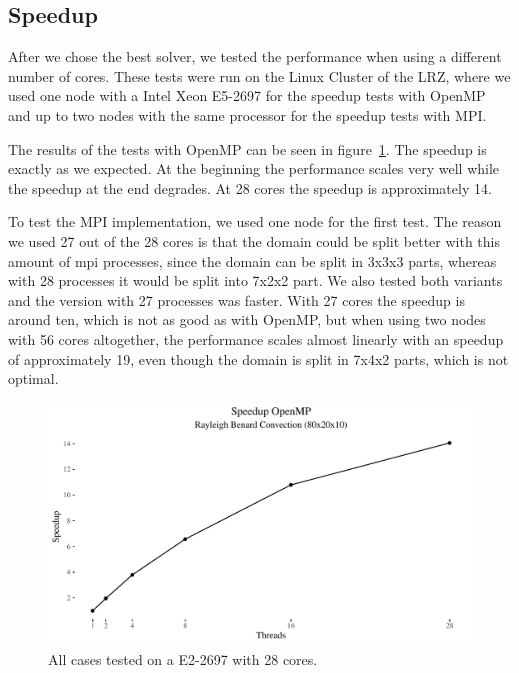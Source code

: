 \documentclass{article}%
\begin{document}
\subsection{Speedup}
After we chose the best solver, we tested the performance when using a different number of cores. These tests were run on the Linux Cluster of the LRZ, where we used one node with a Intel Xeon E5-2697 for the speedup tests with OpenMP and up to two nodes with the same processor for the speedup tests with MPI.

The results of the tests with OpenMP can be seen in figure~\ref{fig:speedup_openmp}. The speedup is exactly as we expected. At the beginning the performance scales very well while the speedup at the end degrades. At 28 cores the speedup is approximately 14.

To test the MPI implementation, we used one node for the first test. The reason we used 27 out of the 28 cores is that the domain could be split better with this amount of mpi processes, since the domain can be split in 3x3x3 parts, whereas with 28 processes it would be split into 7x2x2 part. We also tested both variants and the version with 27 processes was faster. With 27 cores the speedup is around ten, which is not as good as with OpenMP, but when using two nodes with 56 cores altogether, the performance scales almost linearly with an speedup of approximately 19, even though the domain is split in 7x4x2 parts, which is not optimal.


\begin{figure}[htb]
\centering
\includegraphics[width=1\linewidth]{../tests/graphs/speedup_OpenMP_double.pdf}
\caption{All cases tested on a E2-2697 with 28 cores.}
\label{fig:speedup_openmp}
\end{figure}
\end{document}
